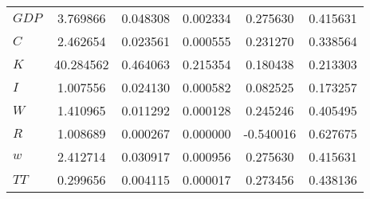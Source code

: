 \begin{center}
\begin{longtable}{lccccc}
$GDP       $	 & 	        3.769866	 & 	        0.048308	 & 	        0.002334	 & 	        0.275630	 & 	        0.415631 \\ 
$C         $	 & 	        2.462654	 & 	        0.023561	 & 	        0.000555	 & 	        0.231270	 & 	        0.338564 \\ 
$K         $	 & 	       40.284562	 & 	        0.464063	 & 	        0.215354	 & 	        0.180438	 & 	        0.213303 \\ 
$I         $	 & 	        1.007556	 & 	        0.024130	 & 	        0.000582	 & 	        0.082525	 & 	        0.173257 \\ 
$W         $	 & 	        1.410965	 & 	        0.011292	 & 	        0.000128	 & 	        0.245246	 & 	        0.405495 \\ 
$R         $	 & 	        1.008689	 & 	        0.000267	 & 	        0.000000	 & 	       -0.540016	 & 	        0.627675 \\ 
$w         $	 & 	        2.412714	 & 	        0.030917	 & 	        0.000956	 & 	        0.275630	 & 	        0.415631 \\ 
$TT        $	 & 	        0.299656	 & 	        0.004115	 & 	        0.000017	 & 	        0.273456	 & 	        0.438136 \\ 
\end{longtable}
 \end{center}
